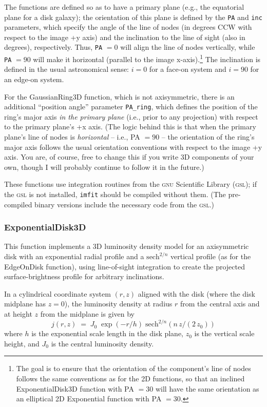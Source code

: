 \documentclass[10pt,a4paper,article]{memoir}
\newcommand{\imfit}{\texttt{imfit}}
\begin{document}
The functions are defined so as to have a primary plane (e.g., the equatorial
plane for a disk galaxy); the orientation of this plane is defined by the
\texttt{PA} and \texttt{inc} parameters, which specify the angle of the line of
nodes (in degrees CCW with respect to the image +y axis) and the inclination to
the line of sight (also in degrees), respectively. Thus, \texttt{PA} $= 0$ will
align the line of nodes vertically, while \texttt{PA} $= 90$ will make it
horizontal (parallel to the image x-axis).\footnote{The goal is to ensure that
the orientation of the component's line of nodes follows the same conventions as
for the 2D functions, so that an inclined ExponentialDisk3D function with PA $=
30$ will have the same orientation as an elliptical 2D Exponential function with
PA $= 30$.} The inclination is defined in the usual astronomical sense: $i = 0$
for a face-on system and $i = 90$ for an edge-on system.

For the GaussianRing3D function, which is not axisymmetric, there is an
additional ``position angle'' parameter \texttt{PA\_ring}, which defines the position of the
ring's major axis \textit{in the primary plane} (i.e., prior to any projection)
with respect to the primary plane's +x axis. (The logic behind this is that when
the primary plane's line of nodes is \textit{horizontal} -- i.e., PA $= 90$ --
the orientation of the ring's major axis follows the usual orientation
conventions with respect to the image +y axis. You are, of course, free to
change this if you write 3D components of your own, though I will probably
continue to follow it in the future.)

These functions use integration routines from the \textsc{gnu} Scientific Library (\textsc{gsl});
if the \textsc{gsl} is not installed, \imfit{} should be compiled without them. (The
pre-compiled binary versions include the necessary code from the \textsc{gsl}.)


\subsubsection{ExponentialDisk3D}

This function implements a 3D luminosity density model for an axisymmetric
disk with an exponential radial profile and a ${\mathrm{sech}}^{2/n}$ vertical profile
(as for the EdgeOnDisk function), using line-of-sight integration to create the projected
surface-brightness profile for arbitrary inclinations.

In a cylindrical coordinate system $(r, z)$ aligned with the disk (where the disk
midplane has $z = 0$), the luminosity density at radius $r$ from 
the central axis and
at height $z$ from the midplane is given by
\begin{equation}
j(r,z) \; = \; J_{0} \; \exp(-r/h) \; {\mathrm{sech}}^{2/n} (n \, z/(2 \, z_{0}))
\end{equation}
where $h$ is the exponential scale length in the disk plane, $z_{0}$ is the vertical
scale height, and $J_{0}$ is the central luminosity density.
\end{document}
